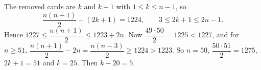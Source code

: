 The removed cards are $k$ and $k+1$ with $1\le k\le n-1$, so
\[
\dfrac{n(n+1)}{2}-(2k+1)=1224,\qquad 3\le2k+1\le2n-1 .
\]
Hence $1227\le\dfrac{n(n+1)}{2}\le1223+2n$. Now $\dfrac{49\cdot50}{2}=1225<1227$, and for $n\ge51$, $\dfrac{n(n+1)}{2}-2n=\dfrac{n(n-3)}{2}\ge1224>1223$. So $n=50$, $\dfrac{50\cdot51}{2}=1275$, $2k+1=51$ and $k=25$. Then $k-20=\boxed{5}$.
